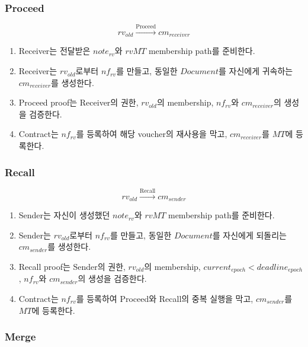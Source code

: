 \documentclass[11pt,a4paper]{extarticle}
\begin{document}
\subsubsection*{Proceed}

\[
  rv_{old}
  \xrightarrow{\mathrm{Proceed}}
  cm_{receiver}
\]

\begin{enumerate}[label=\textbf{\arabic*.},leftmargin=18pt]
  \item Receiver는 전달받은 \(note_{rv}\)와 \(rvMT\) membership path를 준비한다.
  \item Receiver는 \(rv_{old}\)로부터 \(nf_{rv}\)를 만들고, 동일한
        \(\mathit{Document}\)를 자신에게 귀속하는 \(cm_{receiver}\)를 생성한다.
  \item Proceed proof는 Receiver의 권한, \(rv_{old}\)의 membership,
        \(nf_{rv}\)와 \(cm_{receiver}\)의 생성을 검증한다.
  \item Contract는 \(nf_{rv}\)를 등록하여 해당 voucher의 재사용을 막고,
        \(cm_{receiver}\)를 \(MT\)에 등록한다.
\end{enumerate}

\subsubsection*{Recall}

\[
  rv_{old}
  \xrightarrow{\mathrm{Recall}}
  cm_{sender}
\]

\begin{enumerate}[label=\textbf{\arabic*.},leftmargin=18pt]
  \item Sender는 자신이 생성했던 \(note_{rv}\)와 \(rvMT\) membership path를
        준비한다.
  \item Sender는 \(rv_{old}\)로부터 \(nf_{rv}\)를 만들고, 동일한
        \(\mathit{Document}\)를 자신에게 되돌리는 \(cm_{sender}\)를 생성한다.
  \item Recall proof는 Sender의 권한, \(rv_{old}\)의 membership,
        \(current_{epoch}<deadline_{epoch}\), \(nf_{rv}\)와
        \(cm_{sender}\)의 생성을 검증한다.
  \item Contract는 \(nf_{rv}\)를 등록하여 Proceed와 Recall의 중복 실행을 막고,
        \(cm_{sender}\)를 \(MT\)에 등록한다.
\end{enumerate}

\subsubsection*{Merge}
\end{document}
